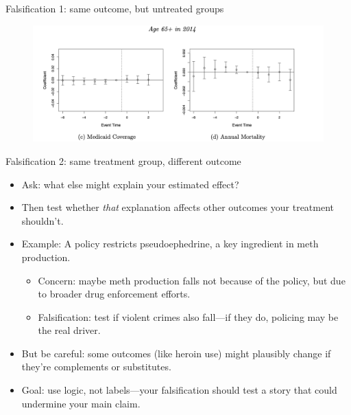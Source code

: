 \documentclass{beamer}
\begin{document}
\begin{frame}{Falsification 1: same outcome, but untreated groups}

		\begin{figure}
		\includegraphics[scale=0.425]{./lecture_includes/placebo_medicaid}
		\end{figure}

\end{frame}

\begin{frame}{Falsification 2: same treatment group, different outcome}

\begin{itemize}
    \item Ask: what else might explain your estimated effect?
    \item Then test whether \emph{that} explanation affects other outcomes your treatment shouldn't.
    \item Example: A policy restricts pseudoephedrine, a key ingredient in meth production.
    \begin{itemize}
        \item Concern: maybe meth production falls not because of the policy, but due to broader drug enforcement efforts.
        \item Falsification: test if violent crimes also fall—if they do, policing may be the real driver.
    \end{itemize}
    \item But be careful: some outcomes (like heroin use) might plausibly change if they’re complements or substitutes.
    \item Goal: use logic, not labels—your falsification should test a story that could undermine your main claim.
\end{itemize}

\end{frame}
\end{document}
